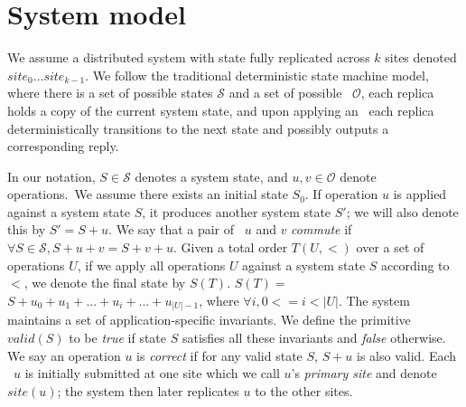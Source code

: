 \section{System model}
\label{chapter:model}
 We assume a distributed system with state fully rep\-licated across
 $k$ sites denoted $\textit{site}_0\ldots \textit{site}_{k-1}$.  We
 follow the traditional deterministic state machine model, where there
 is a set of possible states $\mathcal{S}$ and a set of possible
 \operations\ $\mathcal{O}$, each replica holds a copy of the current
 system state, and upon applying an \operation\ each replica
 deterministically transitions to the next state and possibly outputs
 a corresponding reply.  

In our notation, $S\in\mathcal{S}$ denotes a system state, and
$u,v\in\mathcal{O}$ denote operations.\ We assume there
exists an initial state $S_0$.  If operation $u$ is applied against
a system state $S$, it produces another system state $S'$;
we will also denote this by $S'=S+u$.
We say that a pair of \transactions\ $u$ and $v$ 
{\em commute} 
if $\forall S \in \mathcal{S},S+u+v=S+v+u$.
Given a total order $T(U, <)$ over a
set of operations $U$, if we apply
all operations $U$ against a system state $S$ according
to $<$, we denote the final state by $S(T)$. $S(T) = $
$S+u_{0} + u_{1} + ... + u_{i} + ... + u_{|U|-1}$, where $\forall i, 0<=i<|U|$. 
The system maintains a set of application-specific
invariants. We define the primitive $\textit{valid}(S)$ to be {\it
  true} if state $S$ satisfies all these invariants and {\it false}
otherwise. We say an operation $u$ is {\it correct} if for any
valid state $S$, $S+u$ is also valid.
Each \operation\ $u$ is initially submitted at one site which we
call $u$'s \emph{primary site} and denote $\textit{site}(u)$;
the system then later replicates $u$ to the other sites.


